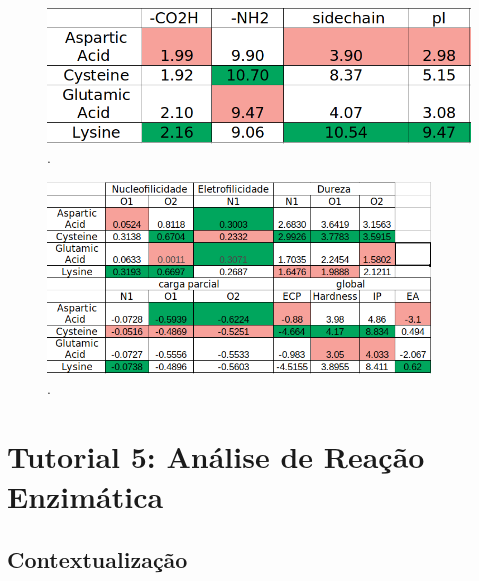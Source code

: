 \documentclass[a4paper,11pt]{refart}
\begin{document}
\hspace*{-\leftmarginwidth}
\begin{minipage}{\fullwidth}
	\begin{figure}[H]
		\begin{center}
			\includegraphics[width=5in]{images/tut4_img17}
			\caption{.}
			\label{fig_tut4_15}
		\end{center}
	\end{figure}
\end{minipage}

\hspace*{-\leftmarginwidth}
\begin{minipage}{\fullwidth}
	\begin{figure}[H]
		\begin{center}
			\includegraphics[width=4in]{images/tut4_img18}
			\caption{.}
			\label{fig_tut4_16}
		\end{center}
	\end{figure}
\end{minipage}



\newpage
\section{Tutorial 5: Análise de Reação Enzimática}

\subsection{Contextualização}
\end{document}
